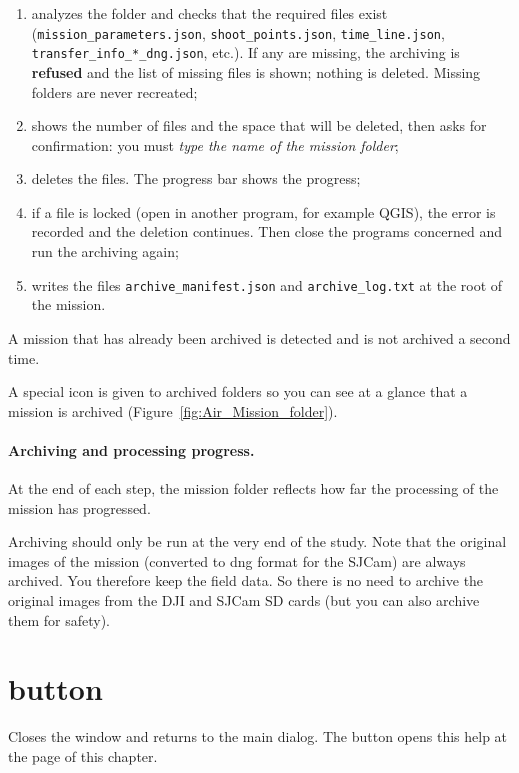 \documentclass[a4paper,11pt]{report}
\DeclareRobustCommand{\bouton}[1]{\texorpdfstring{\fbox{\small\textsf{#1}}}{#1}}
\begin{document}
\begin{enumerate}
  \item analyzes the folder and checks that the required files exist (\texttt{mission\_parameters.json}, \texttt{shoot\_points.json}, \texttt{time\_line.json}, \texttt{transfer\_info\_*\_dng.json}, etc.).
        If any are missing, the archiving is \textbf{refused} and the list of missing files is shown; nothing is deleted. Missing folders are never recreated;
  \item shows the number of files and the space that will be deleted, then asks for confirmation: you must \emph{type the name of the mission folder};
  \item deletes the files. The progress bar shows the progress;
  \item if a file is locked (open in another program, for example QGIS), the error is recorded and the deletion continues. Then close the programs concerned and run the archiving again;
  \item writes the files \texttt{archive\_manifest.json} and \texttt{archive\_log.txt} at the root of the mission.
\end{enumerate}

A mission that has already been archived is detected and is not archived a second time.


 A special icon is given to archived folders so you can see at a glance that a mission is archived (Figure~\ref{fig:Air_Mission_folder}).


\paragraph{Archiving and processing progress.} At the end of each step, the mission folder reflects how far the processing of the mission has progressed.

Archiving should only be run at the very end of the study. Note that the original images of the mission (converted to dng format for the SJCam) are always archived. You therefore keep the field data. So there is no need to archive the original images from the DJI and SJCam SD cards (but you can also archive them for safety).

\section{\bouton{Close} button}\label{btn:step7_close}
Closes the window and returns to the main dialog. The \bouton{?} button opens this help at the page of this chapter.
\end{document}

